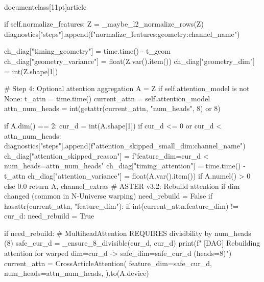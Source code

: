 \\documentclass[11pt]{article}
\begin{document}
\begin{CodeBlock}
            if self.normalize_features:
                Z = _maybe_l2_normalize_rows(Z)
                diagnostics["steps"].append(f"normalize_features:geometry:{channel_name}")

            ch_diag["timing_geometry"] = time.time() - t_geom
            ch_diag["geometry_variance"] = float(Z.var().item())
            ch_diag["geometry_dim"] = int(Z.shape[1])

            # Step 4: Optional attention aggregation
            A = Z
            if self.attention_model is not None:
                t_attn = time.time()
                current_attn = self.attention_model
                attn_num_heads = int(getattr(current_attn, "num_heads", 8) or 8)
                
                if A.dim() == 2:
                    cur_d = int(A.shape[1])
                    if cur_d <= 0 or cur_d < attn_num_heads:
                        diagnostics["steps"].append(f"attention_skipped_small_dim:{channel_name}")
                        ch_diag["attention_skipped_reason"] = f"feature_dim={cur_d} < num_heads={attn_num_heads}"
                        ch_diag["timing_attention"] = time.time() - t_attn
                        ch_diag["attention_variance"] = float(A.var().item()) if A.numel() > 0 else 0.0
                        return A, channel_extras
                    # ASTER v3.2: Rebuild attention if dim changed (common in N-Universe warping)
                    need_rebuild = False
                    if hasattr(current_attn, "feature_dim"):
                        if int(current_attn.feature_dim) != cur_d:
                            need_rebuild = True
                    
                    if need_rebuild:
                        # MultiheadAttention REQUIRES divisibility by num_heads (8)
                        safe_cur_d = _ensure_8_divisible(cur_d, cur_d)
                        print(f"      [DAG] Rebuilding attention for warped dim={cur_d} -> safe_dim={safe_cur_d} (heads=8)")
                        current_attn = CrossArticleAttention(
                            feature_dim=safe_cur_d,
                            num_heads=attn_num_heads,
                        ).to(A.device)


\end{CodeBlock}
\end{document}
